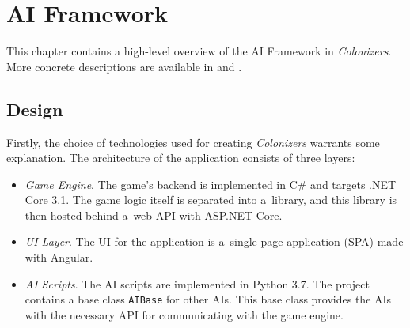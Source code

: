 \chapter{AI Framework}

This chapter contains a high-level overview of the AI Framework in \emph{Colonizers}.
More concrete descriptions are available in  and .

\section{Design}

Firstly, the choice of technologies used for creating \emph{Colonizers}
warrants some explanation. The architecture of the application consists of three layers:
\begin{itemize}
    \item \emph{Game Engine}. The game's backend is implemented in C\# and targets
        .NET Core 3.1. The game logic itself is separated into a~library,
        and this library is then hosted behind a~web API with ASP.NET Core.
    \item \emph{UI Layer}. The UI for the application is a~single-page application
        (SPA) made with Angular.
    \item \emph{AI Scripts}. The AI scripts are implemented in Python 3.7. The project
        contains a base class \texttt{AIBase} for other AIs. This base class provides
        the AIs with the necessary API for communicating with the game engine.
\end{itemize}

